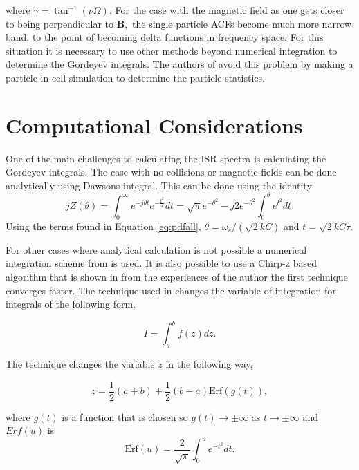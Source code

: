 \noindent where $\gamma = \tan^{-1}(\nu\Omega)$. For the case with the magnetic field as one gets closer to being perpendicular to $\mathbf{B},$ the single particle ACFs become much more narrow band, to the point of becoming delta functions in frequency space. For this situation it is necessary to use other methods beyond numerical integration to determine the Gordeyev integrals. The authors of \citet{kudeki:milla:2} avoid this problem by making a particle in cell simulation to determine the particle statistics. 


 \section{Computational Considerations}
One of the main challenges to calculating the ISR spectra is calculating the Gordeyev integrals. The case with no collisions or magnetic fields can be done analytically using Dawsons integral. This can be done using the identity
\begin{equation}
\label{eq:daw1}
jZ(\theta) = \int_0^{\infty} e^{-j\theta t}e^{-\frac{t^2}{4}}dt = \sqrt{\pi}e^{-\theta^2}-j2e^{-\theta^2}\int_0^\theta e^{t^2}dt.
\end{equation}
Using the terms found in Equation \ref{eq:pdfall}, $\theta=\omega_s/\left(\sqrt{2}kC\right)$ and $t=\sqrt{2}kC\tau$.

For other cases where analytical calculation is not possible a numerical integration scheme from \citet{Ooi:2007jx} is used. It is also possible to use a Chirp-z based algorithm that is shown in \citet{Li:1991gr} from the experiences of the author the first technique converges faster. The technique used in \citet{Ooi:2007jx} changes the variable of integration for integrals of the following form,

\begin{equation}
\label{eq:Sommer}
I=\int_a^b f(z) dz.
\end{equation}

\noindent The technique changes the variable $z$ in the following way,

\begin{equation}
\label{eq:newz}
z = \frac{1}{2}(a+b)+\frac{1}{2} (b-a)\text{Erf}(g(t)),
\end{equation}

\noindent where $g(t)$ is a function that is chosen so  $g(t)\rightarrow\pm \infty$ as $t\rightarrow\pm \infty$ and $Erf(u)$ is 
\begin{equation}
\label{eq:erf1}
\text{Erf}(u) = \frac{2}{\sqrt{\pi}}\int_0^u e^{-t^2}dt.
\end{equation}

